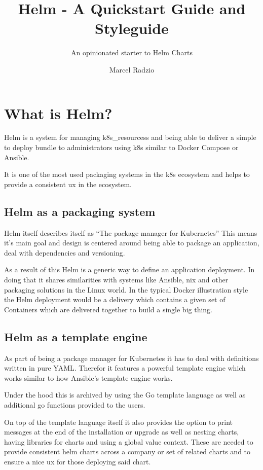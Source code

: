 \documentclass[english]{scrreprt}
\title{Helm - A Quickstart Guide and Styleguide}
\subtitle{An opinionated starter to Helm Charts}
\author{Marcel Radzio}
\begin{document}
\maketitle
\tableofcontents

\chapter{What is Helm?}
Helm is a system for managing \Glspl{k8s_resources} and being able to deliver a simple to deploy bundle to administrators using \Gls{k8s} similar to Docker Compose or Ansible.

It is one of the most used packaging systems in the \Gls{k8s} ecosystem and helps to provide a consistent \gls{ux} in the ecosystem.

\section{Helm as a packaging system}
Helm itself describes itself as \enquote{The package manager for Kubernetes}\cite{helm}
This means it's main goal and design is centered around being able to package an application, deal with dependencies and versioning.

As a result of this Helm is a generic way to define an application deployment.
In doing that it shares similarities with systems like Ansible, nix and other packaging solutions in the Linux world. 
In the typical Docker illustration style the Helm deployment would be a delivery which contains a given set of Containers which are delivered together to build a single big thing.

\section{Helm as a template engine}
As part of being a package manager for Kubernetes it has to deal with definitions written in pure YAML.
Therefor it features a powerful template engine which works similar to how Ansible's template engine works.

Under the hood this is archived by using the Go template language\cite{helm:functions_and_pipelines,go_template} as well as additional go functions provided to the users.

On top of the template language itself it also provides the option to print messages at the end of the installation or upgrade as  well as nesting charts, having libraries for charts and using a global value context.
These are needed to provide consistent helm charts across a company or set of related charts and to ensure a nice \gls{ux} for those deploying said chart.
\end{document}

